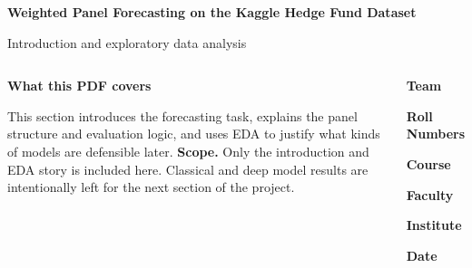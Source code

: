 \begin{frame}[plain]
  \vspace{0.2em}
  {\fontsize{24}{28}\selectfont\bfseries Weighted Panel Forecasting on the Kaggle Hedge Fund Dataset\par}
  \vspace{0.2em}
  {\large\color{DeckMuted}Introduction and exploratory data analysis\par}
  \vspace{0.55em}

  \begin{columns}[T,onlytextwidth]
    \begin{softcard}
      {\bfseries What this PDF covers}\par
      \vspace{0.3em}
      This section introduces the forecasting task, explains the panel structure and evaluation logic, and uses EDA to justify what kinds of models are defensible later.
      \divider
      {\small
      \textbf{Scope.} Only the introduction and EDA story is included here. Classical and deep model results are intentionally left for the next section of the project.}
    \end{softcard}

    \begin{whitecard}
      \footnotesize
      {\bfseries Team}\par
      \TeamNames

      \vspace{0.35em}
      {\bfseries Roll Numbers}\par
      \RollNumbers

      \vspace{0.35em}
      {\bfseries Course}\par
      \CourseName

      \vspace{0.35em}
      {\bfseries Faculty}\par
      \FacultyName

      \vspace{0.35em}
      {\bfseries Institute}\par
      \InstituteName

      \vspace{0.35em}
      {\bfseries Date}\par
      \DeckDate
    \end{whitecard}
  \end{columns}
\end{frame}


